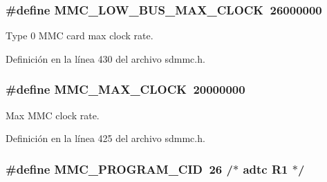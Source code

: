 \subsubsection[{\texorpdfstring{M\+M\+C\+\_\+\+L\+O\+W\+\_\+\+B\+U\+S\+\_\+\+M\+A\+X\+\_\+\+C\+L\+O\+CK}{MMC_LOW_BUS_MAX_CLOCK}}]{\setlength{\rightskip}{0pt plus 5cm}\#define M\+M\+C\+\_\+\+L\+O\+W\+\_\+\+B\+U\+S\+\_\+\+M\+A\+X\+\_\+\+C\+L\+O\+CK~26000000}\hypertarget{group___c_h_i_p___s_d_m_m_c___definitions_ga65bf7243fd919508d7d7b9ac358269cf}{}\label{group___c_h_i_p___s_d_m_m_c___definitions_ga65bf7243fd919508d7d7b9ac358269cf}


Type 0 M\+MC card max clock rate. 



Definición en la línea 430 del archivo sdmmc.\+h.

\subsubsection[{\texorpdfstring{M\+M\+C\+\_\+\+M\+A\+X\+\_\+\+C\+L\+O\+CK}{MMC_MAX_CLOCK}}]{\setlength{\rightskip}{0pt plus 5cm}\#define M\+M\+C\+\_\+\+M\+A\+X\+\_\+\+C\+L\+O\+CK~20000000}\hypertarget{group___c_h_i_p___s_d_m_m_c___definitions_ga6efbc115fac65c191a0bb3cc9b90ad59}{}\label{group___c_h_i_p___s_d_m_m_c___definitions_ga6efbc115fac65c191a0bb3cc9b90ad59}


Max M\+MC clock rate. 



Definición en la línea 425 del archivo sdmmc.\+h.

\subsubsection[{\texorpdfstring{M\+M\+C\+\_\+\+P\+R\+O\+G\+R\+A\+M\+\_\+\+C\+ID}{MMC_PROGRAM_CID}}]{\setlength{\rightskip}{0pt plus 5cm}\#define M\+M\+C\+\_\+\+P\+R\+O\+G\+R\+A\+M\+\_\+\+C\+ID~26		/$\ast$ adtc                    R1  $\ast$/}\hypertarget{group___c_h_i_p___s_d_m_m_c___definitions_ga67726d621affba67a398fc6c63c0d53b}{}\label{group___c_h_i_p___s_d_m_m_c___definitions_ga67726d621affba67a398fc6c63c0d53b}


